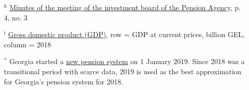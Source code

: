 \begin{singlespace}
\begin{itemize}
    \item[$^\text{h}$] \href{https://www.pensions.ge/docs/legislation/investment-board-protocol-4.pdf}{Minutes of the meeting of the investment board of the Pension Agency}, p. 4, no. 3
    \item[$^\text{i}$] \href{https://www.geostat.ge/en/modules/categories/23/gross-domestic-product-gdp}{Gross domestic product (GDP)}, row = GDP at current prices, billion GEL, column = 2018
    \item[$^\text{*}$] Georgia started a \href{https://agenda.ge/en/news/2019/13}{new pension system} on 1 January 2019. Since 2018 was a transitional period with scarce data, 2019 is used as the best approximation for Georgia's pension system for 2018.
\end{itemize}
\end{singlespace}

\clearpage

